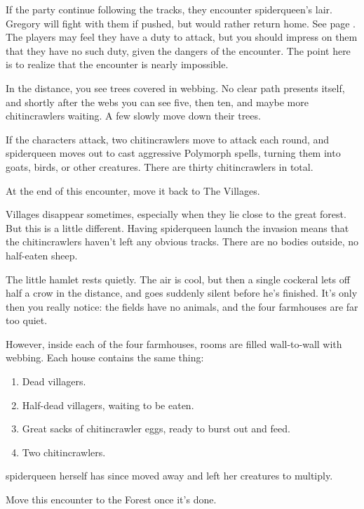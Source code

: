 \begin{multicols}{2}
If the party continue following the tracks, they encounter \gls{spiderqueen}'s lair.  Gregory will fight with them if pushed, but would rather return home.  See page \pageref{spiderqueen}.  The players may feel they have a duty to attack, but you should impress on them that they have no such duty, given the dangers of the encounter.  The point here is to realize that the encounter is nearly impossible.

\begin{boxtext}
	In the distance, you see trees covered in webbing.  No clear path presents itself, and shortly after the webs you can see five, then ten, and maybe more chitincrawlers waiting.  A few slowly move down their trees.
\end{boxtext}

If the characters attack, two chitincrawlers move to attack each round, and \gls{spiderqueen} moves out to cast aggressive Polymorph spells, turning them into goats, birds, or other creatures.
There are thirty chitincrawlers in total.

At the end of this encounter, move it back to The Villages.


\humansoldier


Villages disappear sometimes, especially when they lie close to the great forest.  But this is a little different.  Having \gls{spiderqueen} launch the invasion means that the chitincrawlers haven't left any obvious tracks.  There are no bodies outside, no half-eaten sheep.

\begin{boxtext}
	The little hamlet rests quietly.  The air is cool, but then a single cockeral lets off half a crow in the distance, and goes suddenly silent before he's finished.  It's only then you really notice: the fields have no animals, and the four farmhouses are far too quiet.
\end{boxtext}

However, inside each of the four farmhouses, rooms are filled wall-to-wall with webbing.  Each house contains the same thing:

\begin{enumerate}

	\item{Dead villagers.}
	\item{Half-dead villagers, waiting to be eaten.}
	\item{Great sacks of chitincrawler eggs, ready to burst out and feed.}
	\item{Two chitincrawlers.}
\end{enumerate}

\Gls{spiderqueen} herself has since moved away and left her creatures to multiply.

Move this encounter to the Forest once it's done.

\end{multicols}

